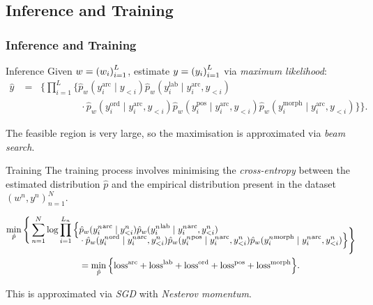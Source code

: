 \documentclass[8pt]{beamer}
\theoremstyle{definition}
\theoremstyle{plain}
\theoremstyle{definition}
\theoremstyle{remark}
\numberwithin{equation}{section}
\numberwithin{figure}{section}
\numberwithin{table}{section}
\begin{document}
\subsection{Inference and Training}
\begin{frame}
    \frametitle{Inference and Training}
    \setlength{\abovedisplayskip}{0pt}
\setlength{\belowdisplayskip}{0pt}
\setlength{\abovedisplayshortskip}{0pt}
\setlength{\belowdisplayshortskip}{0pt}
    \begin{block}{Inference}
        Given \(w=\qty(w_{i})_{i=1}^{L}\), estimate \(y = \qty(y_{i})_{i=1}^{L}\) via \textit{maximum likelihood}:
        \begin{align*}
            \hat{y} &= \mathop{\underset{y}{\operatorname{arg\,max}}} \Bigg\{  \prod_{i=1}^{L} \Big\{ \hat{p}_{w}(y_{i}^{\text{arc}} \mid y_{<i}) \hat{p}_{w}(y_{i}^{\text{lab}} \mid y_{i}^{\text{arc}}, y_{<i}) \\[-2.5em]
            &\phantom{\ = \mathop{\underset{y}{\operatorname{arg\,max}}} \Bigg\{ \prod_{i=1}^{L} \Big\{} \cdot \hat{p}_{w}(y_{i}^{\text{ord}} \mid y_{i}^{\text{arc}}, y_{<i}) \hat{p}_{w}(y_{i}^{\text{pos}} \mid y_{i}^{\text{arc}}, y_{<i}) \hat{p}_{w}(y_{i}^{\text{morph}} \mid y_{i}^{\text{arc}}, y_{<i}) \Big\} \Bigg\}.
        \end{align*}
    \end{block}

    The feasible region is very large, so the maximisation is approximated via \textit{beam search}.

    \begin{block}{Training}
        The training process involves minimising the \textit{cross-entropy} between the estimated distribution \(\hat{p}\) and the empirical distribution present in the dataset \((w^{n}, y^{n})_{n=1}^{N}\).
        
        \begin{align*}
            \mathop{\underset{\hat{p}}{\min}} \Bigg\{ \sum_{n=1}^{N} \log \prod_{i=1}^{L_{n}} \Big\{ & \hat{p}_{w}({y_{i}^{n}}^{\text{arc}} \mid y_{<i}^{n}) \hat{p}_{w}({y_{i}^{n}}^{\text{lab}} \mid {y_{i}^{n}}^{\text{arc}}, y_{<i}^{n}) \\[-2.25em]
            & \cdot \hat{p}_{w}({y_{i}^{n}}^{\text{ord}} \mid {y_{i}^{n}}^{\text{arc}}, y_{<i}^{n}) \hat{p}_{w}({y_{i}^{n}}^{\text{pos}} \mid {y_{i}^{n}}^{\text{arc}}, y_{<i}^{n}) \hat{p}_{w}({y_{i}^{n}}^{\text{morph}} \mid {y_{i}^{n}}^{\text{arc}}, y_{<i}^{n}) \Big\} \Bigg\} \\
            &= \mathop{\underset{ \hat{p}}{\min}} \qty{\text{loss}^{\text{arc}} + \text{loss}^{\text{lab}} + \text{loss}^{\text{ord}} + \text{loss}^{\text{pos}} + \text{loss}^{\text{morph}}}.
        \end{align*}
    \end{block}

    This is approximated via \textit{SGD} with \textit{Nesterov momentum}.
\end{frame}
\end{document}
